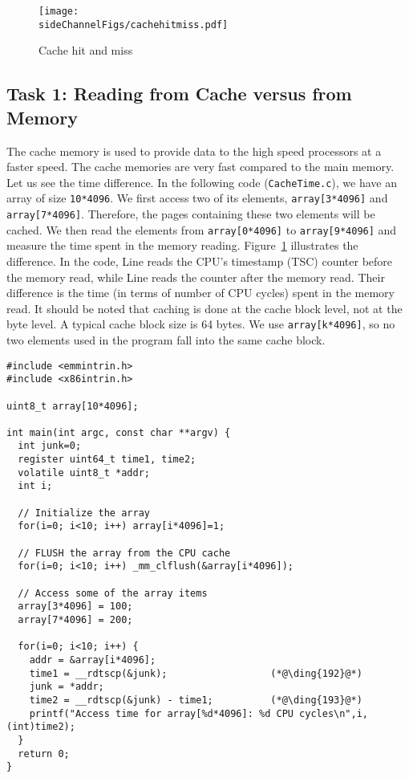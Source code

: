 \begin{figure}[htb]
\centering
\texttt{[image: \\sideChannelFigs/cachehitmiss.pdf]}
\caption{Cache hit and miss}
\label{sidechannel:fig:cachehitmiss}
\end{figure}


\subsection{Task 1: Reading from Cache versus from Memory}

The cache memory is used to provide data to the high speed processors at a faster speed. The
cache memories are very fast compared to the main memory. 
Let us see the time difference. In the following code (\texttt{CacheTime.c}), we 
have an array of size \texttt{10*4096}. We first access two of its elements,
\texttt{array[3*4096]} and \texttt{array[7*4096]}. Therefore, the pages 
containing these two elements will be cached. We then
read the elements from \texttt{array[0*4096]} to \texttt{array[9*4096]} and measure 
the time spent in the memory reading.
Figure~\ref{sidechannel:fig:cachehitmiss} illustrates the difference. 
In the code, Line  reads the CPU's
timestamp (TSC) counter before the memory read, while Line 
reads the counter after the memory read. Their difference is the time (in terms of number of
CPU cycles) spent in the memory read.  It should be noted that 
caching is done at the cache block level, not at the byte level. A typical cache block size 
is 64 bytes. We use \texttt{array[k*4096]}, so no two elements used in 
the program fall into the same cache block. 


\begin{lstlisting}[caption=\texttt{CacheTime.c}]
#include <emmintrin.h>
#include <x86intrin.h>

uint8_t array[10*4096];

int main(int argc, const char **argv) {
  int junk=0;
  register uint64_t time1, time2;
  volatile uint8_t *addr;
  int i;
  
  // Initialize the array
  for(i=0; i<10; i++) array[i*4096]=1;

  // FLUSH the array from the CPU cache
  for(i=0; i<10; i++) _mm_clflush(&array[i*4096]);

  // Access some of the array items
  array[3*4096] = 100;
  array[7*4096] = 200;

  for(i=0; i<10; i++) {
    addr = &array[i*4096];
    time1 = __rdtscp(&junk);                  (*@\ding{192}@*)
    junk = *addr;
    time2 = __rdtscp(&junk) - time1;          (*@\ding{193}@*)
    printf("Access time for array[%d*4096]: %d CPU cycles\n",i, (int)time2);
  }
  return 0;
}
\end{lstlisting}


